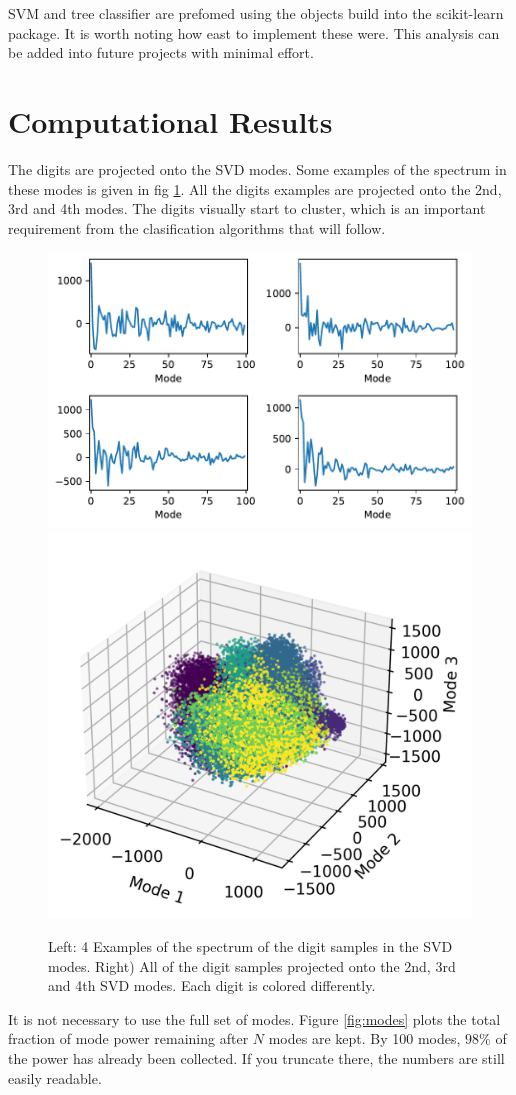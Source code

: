 \documentclass{article}
\begin{document}
    SVM and tree classifier are prefomed using the objects build into the
    scikit-learn package. It is worth noting how east to implement these were.
    This analysis can be added into future projects with minimal effort.

    \section{Computational Results}
    The digits are projected onto the SVD modes. Some examples of the spectrum
    in these modes is given in fig \ref{fig:projection}. All the digits examples
    are projected onto the 2nd, 3rd and 4th modes. The digits visually start to
    cluster, which is an important requirement from the clasification algorithms
    that will follow.

    \begin{figure}[tbp]
        \includegraphics[width=.48\textwidth]{svd_spectrum.pdf}
        \includegraphics[width=.48\textwidth]{svd_projection.png}
        \caption{\label{fig:projection} Left: 4 Examples of the spectrum of
        the digit samples in the SVD modes. Right) All of the digit samples
        projected onto the 2nd, 3rd and 4th SVD modes. Each digit is colored
        differently.}
    \end{figure}

    It is not necessary to use the full set of modes. Figure \ref{fig:modes}
    plots the total fraction of mode power remaining after $N$ modes are kept.
    By 100 modes, $98\%$ of the power has already been collected. If you
    truncate there, the numbers are still easily readable.
\end{document}
